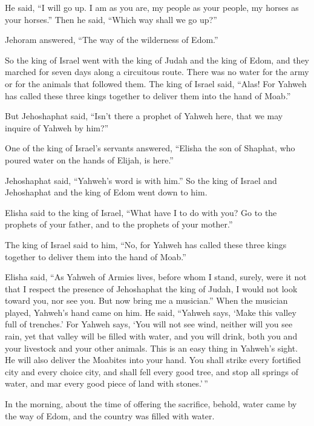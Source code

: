 He said, ``I will go up. I am as you are, my people as your people, my
horses as your horses.''  Then he said, ``Which way shall
we go up?''

Jehoram answered, ``The way of the wilderness of Edom.''

 So the king of Israel went with the king of Judah and the
king of Edom, and they marched for seven days along a circuitous route.
There was no water for the army or for the animals that followed them.
 The king of Israel said, ``Alas! For Yahweh has called
these three kings together to deliver them into the hand of Moab.''

 But Jehoshaphat said, ``Isn't there a prophet of Yahweh
here, that we may inquire of Yahweh by him?''

One of the king of Israel's servants answered, ``Elisha the son of
Shaphat, who poured water on the hands of Elijah, is here.''

 Jehoshaphat said, ``Yahweh's word is with him.'' So the
king of Israel and Jehoshaphat and the king of Edom went down to him.

 Elisha said to the king of Israel, ``What have I to do
with you? Go to the prophets of your father, and to the prophets of your
mother.''

The king of Israel said to him, ``No, for Yahweh has called these three
kings together to deliver them into the hand of Moab.''

 Elisha said, ``As Yahweh of Armies lives, before whom I
stand, surely, were it not that I respect the presence of Jehoshaphat
the king of Judah, I would not look toward you, nor see you.
 But now bring me a musician.'' When the musician played,
Yahweh's hand came on him.  He said, ``Yahweh says, `Make
this valley full of trenches.'  For Yahweh says, `You
will not see wind, neither will you see rain, yet that valley will be
filled with water, and you will drink, both you and your livestock and
your other animals.  This is an easy thing in Yahweh's
sight. He will also deliver the Moabites into your hand. 
You shall strike every fortified city and every choice city, and shall
fell every good tree, and stop all springs of water, and mar every good
piece of land with stones.'\,''

 In the morning, about the time of offering the
sacrifice, behold, water came by the way of Edom, and the country was
filled with water.

